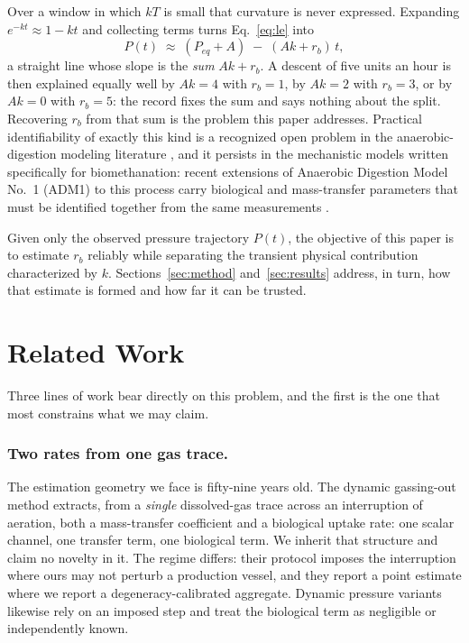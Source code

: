 \documentclass[runningheads]{llncs}
\newcommand{\rb}{\ensuremath{r_{b}}}
\begin{document}
Over a window in which $kT$ is small that curvature is never expressed.
Expanding $e^{-kt}\approx 1-kt$ and collecting terms turns
Eq.~\eqref{eq:le} into
\begin{equation}
P(t)\;\approx\;(P_{eq}+A)\;-\;(Ak+\rb)\,t ,
\label{eq:degen}
\end{equation}
a straight line whose slope is the \emph{sum} $Ak+\rb$. A descent of
five units an hour is then explained equally well by $Ak=4$ with
$\rb=1$, by $Ak=2$ with $\rb=3$, or by $Ak=0$ with $\rb=5$: the record
fixes the sum and says nothing about the split. Recovering $\rb$ from
that sum is the problem this paper addresses. Practical
identifiability of exactly this kind
is a recognized open problem in the anaerobic-digestion modeling
literature \cite{donosobravo2011model}, and it persists in the
mechanistic models written specifically for biomethanation: recent
extensions of Anaerobic Digestion Model No.~1 (ADM1) to this process
carry biological and mass-transfer
parameters that must be identified together from the same measurements
\cite{acostapavas2023dynamic}.

Given only the observed pressure trajectory $P(t)$, the objective of
this paper is to estimate \rb{} reliably while separating the transient
physical contribution characterized by $k$. Sections~\ref{sec:method}
and~\ref{sec:results} address, in turn, how that estimate is formed and
how far it can be trusted.

\section{Related Work}
\label{sec:related}

Three lines of work bear directly on this problem, and the first is the
one that most constrains what we may claim.

\subsubsection{Two rates from one gas trace.}
The estimation geometry we face is fifty-nine years old. The dynamic
gassing-out method \cite{bandyopadhyay1967dynamic} extracts, from a
\emph{single} dissolved-gas trace across an interruption of aeration,
both a mass-transfer coefficient and a biological uptake rate: one
scalar channel, one transfer term, one biological term. We inherit that
structure and claim no novelty in it. The regime differs: their
protocol imposes the interruption where ours may not perturb a
production vessel, and they report a point estimate where we report a
degeneracy-calibrated aggregate. Dynamic pressure variants
\cite{linek1989dynamic} likewise rely on an imposed step and treat the
biological term as negligible or independently known.
\end{document}
